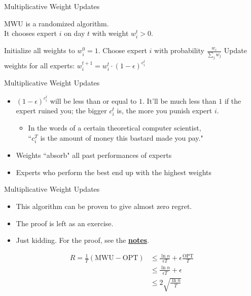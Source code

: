 \documentclass[10pt]{beamer}
\begin{document}
\begin{frame}[fragile]{Multiplicative Weight Updates}

MWU is a randomized algorithm. \\
It chooses expert $i$ on day $t$ with weight $w_i^t > 0$.
\begin{algorithm}[H]
\begin{algorithmic}[1]
\STATE Initialize all weights to $w_i^0 = 1$.
  \STATE Choose expert $i$ with probability $\frac{w_i}{\sum_jw_j}$
  \STATE Update weights for all experts: $w_i^{t + 1} = w_i^t \cdot (1 - \epsilon)^{c_i^t}$
\ENDFOR
\end{algorithmic}
\caption{Multiplicative Weight Updates}
\label{alg:mwu}
\end{algorithm}

\end{frame}

\begin{frame}[fragile]{Multiplicative Weight Updates}

\begin{itemize}
\item $(1 - \epsilon)^{c_i^t}$ will be less than or equal to $1$. It'll be much less than $1$ if the expert ruined you; the bigger $c_i^t$ is, the more you punish expert $i$.
  \vspace*{-4mm}
  \begin{itemize}
  \item In the words of a certain theoretical computer scientist, \\
  ``$c_i^T$ is the amount of money this bastard made you pay."
  \end{itemize}
\item Weights ``absorb" all past performances of experts
\item Experts who perform the best end up with the highest weights
\end{itemize}

\end{frame}

\begin{frame}[fragile]{Multiplicative Weight Updates}

\begin{itemize}
\item This algorithm can be proven to give almost zero regret.
\item The proof is left as an exercise.
\item Just kidding. For the proof, see the \href{https://inst.eecs.berkeley.edu/~cs170/fa16/MWUCS170.pdf}{\textbf{notes}}.
\end{itemize}
\begin{align*}
R = \frac{1}{T}(\text{MWU} - \text{OPT}) &\leq \frac{\ln{n}}{\epsilon T} + \epsilon\frac{\text{OPT}}{T} \\
&\leq \frac{\ln{n}}{\epsilon T} + \epsilon \\
&\leq 2\sqrt{\frac{\ln{n}}{T}}
\end{align*}

\end{frame}
\end{document}
